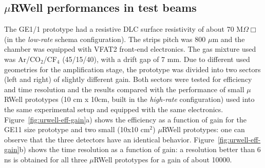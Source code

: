\subsection{$\mu$RWell performances in test beams}
\label{section:uRWell-performance}

The GE1/1 prototype had a resistive DLC surface resistivity of about 70 M$\Omega\Box$ (in the \textit{low-rate} schema configuration). 
The strips pitch was 800 $\mu$m and the chamber was equipped with VFAT2 front-end electronics. 
The gas mixture used was Ar/CO$_2$/CF$_4$ (45/15/40), with a drift gap of 7 mm. 
Due to different used geometries for the amplification stage, the prototype was divided into two sectors (left and right) of slightly different gain. 
Both sectors were tested for efficiency and time resolution and the results compared with the performance of small $\mu$RWell prototypes (10 cm x 10cm, built in the \textit{high-rate} configuration) used into the same experimental setup and equipped with the same electronics. 
Figure~\ref{fig:urwell-eff-gain}a) shows the efficiency as a function of gain for the GE11 size prototype and two small (10x10 cm$^2$) $\mu$RWell prototypes: one can observe that the three detectors have an identical behavior. 
Figure~\ref{fig:urwell-eff-gain}b) shows the time resolution as a function of gain: a resolution better than 6 ns is obtained for all three $\mu$RWell prototypes for a gain of about 10000.

